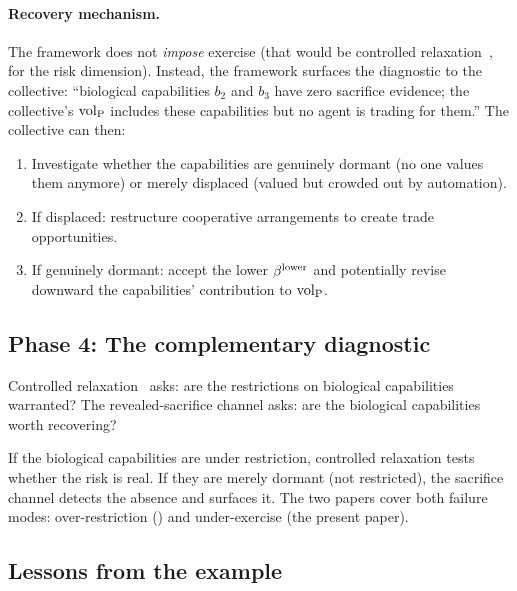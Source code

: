 \paragraph{Recovery mechanism.}
The framework does not \emph{impose} exercise (that would be
controlled relaxation~\citep[Controlled~Relaxation]{lasser2026wamura}, for the risk
dimension).  Instead, the framework surfaces the diagnostic to the
collective: ``biological capabilities $b_2$ and $b_3$ have zero
sacrifice evidence; the collective's ${\operatorname{vol}_{\mathrm{P}}}$ includes these
capabilities but no agent is trading for them.''  The collective
can then:
\begin{enumerate}
\item[(a)] Investigate whether the capabilities are genuinely
  dormant (no one values them anymore) or merely displaced (valued
  but crowded out by automation).
\item[(b)] If displaced: restructure cooperative arrangements to
  create trade opportunities.
\item[(c)] If genuinely dormant: accept the lower $\beta^{\mathrm{lower}}$ and
  potentially revise downward the capabilities' contribution to
  ${\operatorname{vol}_{\mathrm{P}}}$.
\end{enumerate}

\subsection{Phase 4: The complementary diagnostic}

Controlled relaxation~\citep[Controlled~Relaxation]{lasser2026wamura} asks: are the
restrictions on biological capabilities warranted?  The
revealed-sacrifice channel asks: are the biological capabilities
worth recovering?

If the biological capabilities are under restriction, controlled
relaxation tests whether the risk is real.  If they are merely
dormant (not restricted), the sacrifice channel detects the
absence and surfaces it.  The two papers cover both failure modes:
over-restriction
(\citealp[Controlled~Relaxation]{lasser2026wamura}) and
under-exercise (the present paper).

\subsection{Lessons from the example}

